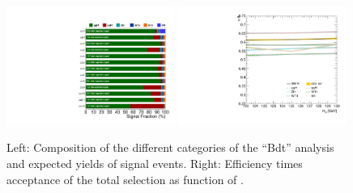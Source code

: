 \begin{figure}[hbp]
    \centering
    \includegraphics[width=0.49\textwidth]{figures/signal_model/signal_composition}
    \includegraphics[width=0.49\textwidth]{figures/signal_model/effAcc}
    \caption{Left: Composition of the different categories of the ``Bdt'' analysis and expected yields of signal events.
    Right: Efficiency times acceptance of the total selection as function of \mH.}
    \label{sigmodel:comp}
\end{figure}

